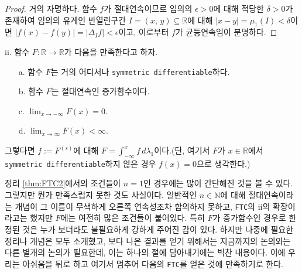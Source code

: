\begin{proof}
    거의 자명하다. 함수 $f$가 절대연속이므로 임의의 $\epsilon>0$에 대해 적당한 $\delta>0$가 존재하여 임의의 유계인 반열린구간 $I=(x,\,y)\subseteq\mathbb{R}$에 대해 $|x-y|=\mu_1(I)<\delta$이면 $|f(x)-f(y)|=|\Delta_If|<\epsilon$이고, 이로부터 $f$가 균등연속임이 분명하다.
\end{proof}

 ii. 함수 $F:\mathbb{R}\to\mathbb{R}$가 다음을 만족한다고 하자.
\begin{enumerate}
    \item[a.] 함수 $F$는 거의 어디서나 \texttt{symmetric differentiable}하다.
    \item[b.] 함수 $F$는 절대연속인 증가함수이다.
    \item[c.] $\lim_{x\to-\infty}F(x)=0$.
    \item[d.] $\lim_{x\to\infty}F(x)<\infty$.
\end{enumerate}
그렇다면 $f:=F^{(s)}$에 대해 $F=\int_{-\infty}^xf\,d\lambda_1$이다.(단, 여기서 $F$가 $x\in\mathbb{R}$에서 \texttt{symmetric differentiable}하지 않은 경우 $f(x)=0$으로 생각한다.)

\vspace{6pt}
정리 \ref{thm:FTC2}에서의 조건들이 $n=1$인 경우에는 많이 간단해진 것을 볼 수 있다. 그렇지만 뭔가 만족스럽지 못한 것도 사실이다. 일반적인 $n\in\mathbb{N}$에 대해 절대연속이라는 개념이 그 이름이 무색하게 오른쪽 연속성조차 함의하지 못하고, \texttt{FTC}의 ii의 확장이라고는 했지만 $F$에는 여전히 많은 조건들이 붙어있다. 특히 $F$가 증가함수인 경우로 한정된 것은 누가 보더라도 불필요하게 강하게 주어진 감이 있다. 하지만 나중에 필요한 정리나 개념은 모두 소개했고, 보다 나은 결과를 얻기 위해서는 지금까지의 논의와는 다른 별개의 논의가 필요한데, 이는 하나의 절에 담아내기에는 벅찬 내용이다. 이에 우리는 아쉬움을 뒤로 하고 여기서 멈추어 다음의 \texttt{FTC}를 얻은 것에 만족하기로 한다.\footnotemark

